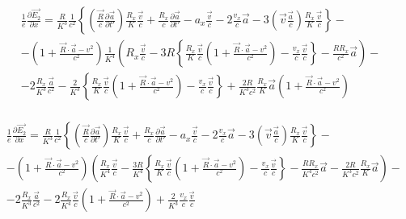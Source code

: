 \documentclass[11pt]{article}
\begin{document}
\[\begin{align}
  & \frac{1}{e}\frac{\partial \overrightarrow{{{E}_{2}}}}{\partial x}=\frac{R}{{{K}^{3}}}\frac{1}{{{c}^{2}}}\left\{ \left( \frac{\overrightarrow{R}}{c}\frac{\partial \overrightarrow{a}}{\partial t'} \right)\frac{{{R}_{x}}}{K}\frac{\overrightarrow{v}}{c}+\frac{{{R}_{x}}}{c}\frac{\partial \overrightarrow{a}}{\partial t'}-{{a}_{x}}\frac{\overrightarrow{v}}{c}-2\frac{{{v}_{x}}}{c}\overrightarrow{a}-3\left( \overrightarrow{v}\frac{\overrightarrow{a}}{c} \right)\frac{{{R}_{x}}}{K}\frac{\overrightarrow{v}}{c} \right\}- \\
 & -\left( 1+\frac{\overrightarrow{R}\cdot \overrightarrow{a}-{{v}^{2}}}{{{c}^{2}}} \right)\frac{1}{{{K}^{4}}}\left( {{R}_{x}}\frac{\overrightarrow{v}}{c}-3R\left\{ \frac{{{R}_{x}}}{K}\frac{\overrightarrow{v}}{c}\left( 1+\frac{\overrightarrow{R}\cdot \overrightarrow{a}-{{v}^{2}}}{{{c}^{2}}} \right)-\frac{{{v}_{x}}}{c}\frac{\overrightarrow{v}}{c} \right\}-\frac{R{{R}_{x}}}{{{c}^{2}}}\overrightarrow{a} \right)- \\
 & -2\frac{{{R}_{x}}}{{{K}^{3}}}\frac{\overrightarrow{a}}{{{c}^{2}}}-\frac{2}{{{K}^{3}}}\left\{ \frac{{{R}_{x}}}{K}\frac{\overrightarrow{v}}{c}\left( 1+\frac{\overrightarrow{R}\cdot \overrightarrow{a}-{{v}^{2}}}{{{c}^{2}}} \right)-\frac{{{v}_{x}}}{c}\frac{\overrightarrow{v}}{c} \right\}+\frac{2R}{{{K}^{3}}{{c}^{2}}}\frac{{{R}_{x}}}{K}\overrightarrow{a}\left( 1+\frac{\overrightarrow{R}\cdot \overrightarrow{a}-{{v}^{2}}}{{{c}^{2}}} \right) \\
\end{align}\]

\[\begin{align}
  & \frac{1}{e}\frac{\partial \overrightarrow{{{E}_{2}}}}{\partial x}=\frac{R}{{{K}^{3}}}\frac{1}{{{c}^{2}}}\left\{ \left( \frac{\overrightarrow{R}}{c}\frac{\partial \overrightarrow{a}}{\partial t'} \right)\frac{{{R}_{x}}}{K}\frac{\overrightarrow{v}}{c}+\frac{{{R}_{x}}}{c}\frac{\partial \overrightarrow{a}}{\partial t'}-{{a}_{x}}\frac{\overrightarrow{v}}{c}-2\frac{{{v}_{x}}}{c}\overrightarrow{a}-3\left( \overrightarrow{v}\frac{\overrightarrow{a}}{c} \right)\frac{{{R}_{x}}}{K}\frac{\overrightarrow{v}}{c} \right\}- \\
 & -\left( 1+\frac{\overrightarrow{R}\cdot \overrightarrow{a}-{{v}^{2}}}{{{c}^{2}}} \right)\left( \frac{{{R}_{x}}}{{{K}^{4}}}\frac{\overrightarrow{v}}{c}-\frac{3R}{{{K}^{4}}}\left\{ \frac{{{R}_{x}}}{K}\frac{\overrightarrow{v}}{c}\left( 1+\frac{\overrightarrow{R}\cdot \overrightarrow{a}-{{v}^{2}}}{{{c}^{2}}} \right)-\frac{{{v}_{x}}}{c}\frac{\overrightarrow{v}}{c} \right\}-\frac{R{{R}_{x}}}{{{K}^{4}}{{c}^{2}}}\overrightarrow{a}-\frac{2R}{{{K}^{3}}{{c}^{2}}}\frac{{{R}_{x}}}{K}\overrightarrow{a} \right)- \\
 & -2\frac{{{R}_{x}}}{{{K}^{3}}}\frac{\overrightarrow{a}}{{{c}^{2}}}-2\frac{{{R}_{x}}}{{{K}^{4}}}\frac{\overrightarrow{v}}{c}\left( 1+\frac{\overrightarrow{R}\cdot \overrightarrow{a}-{{v}^{2}}}{{{c}^{2}}} \right)+\frac{2}{{{K}^{3}}}\frac{{{v}_{x}}}{c}\frac{\overrightarrow{v}}{c} \\
\end{align}\]
\end{document}
